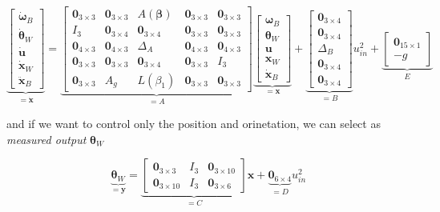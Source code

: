 \begin{equation}
	\underbrace{
		\begin{bmatrix}
			\dot{\boldsymbol{\omega}}_B \\
			\dot{\boldsymbol{\theta}}_W \\
			\dot{\mathbf{u}}            \\
			\dot{\mathbf{x}}_W          \\
			\ddot{\mathbf{x}}_B
		\end{bmatrix}
	}_{=\dot{\mathbf{x}}} =
	\underbrace{
	\begin{bmatrix}
		\mathbf{0}_{3\times 3} & \mathbf{0}_{3\times 3} & A(\boldsymbol{\beta})  & \mathbf{0}_{3\times 3} & \mathbf{0}_{3\times 3} \\
		I_3                    & \mathbf{0}_{3\times 4} & \mathbf{0}_{3\times 4} & \mathbf{0}_{3\times 3} & \mathbf{0}_{3\times 3} \\
		\mathbf{0}_{4\times 3} & \mathbf{0}_{4\times 3} & \Delta_A               & \mathbf{0}_{4\times 3} & \mathbf{0}_{4\times 3} \\
		\mathbf{0}_{3\times 3} & \mathbf{0}_{3\times 3} & \mathbf{0}_{3\times 4} & \mathbf{0}_{3\times 3} & I_3                    \\
		\mathbf{0}_{3\times 3} & A_g                    & L(\beta_1)             & \mathbf{0}_{3\times 3} & \mathbf{0}_{3\times 3}
	\end{bmatrix}
	}_{=A}
	\underbrace{
		\begin{bmatrix}
			\boldsymbol{\omega}_B \\
			\boldsymbol{\theta}_W \\
			\mathbf{u}            \\ 
			\mathbf{x}_W          \\
			\dot{\mathbf{x}}_B
		\end{bmatrix}
	}_{=\mathbf{x}} + 
	\underbrace{
	\begin{bmatrix}
		\mathbf{0}_{3\times 4} \\
		\mathbf{0}_{3\times 4} \\
		\Delta_B               \\
		\mathbf{0}_{3\times 4} \\
		\mathbf{0}_{3\times 4}
	\end{bmatrix}
	}_{=B} u_{in}^2
	+\underbrace{
	\begin{bmatrix}
		\mathbf{0}_{15\times 1} \\
		-g
	\end{bmatrix}}_{E}
\end{equation} 

\noindent and if we want to control only the position and orinetation, we can select as \textit{measured output} $\boldsymbol{\theta}_W$

\begin{equation}
	\underbrace{\boldsymbol{\theta}_W}_{=\mathbf{y}} = 
	\underbrace{\begin{bmatrix}
		\mathbf{0}_{3\times 3}  & I_3 & \mathbf{0}_{3\times 10} \\
		\mathbf{0}_{3\times 10} & I_3 & \mathbf{0}_{3\times 6}
	\end{bmatrix}}_{=C} \mathbf{x} + \underbrace{\mathbf{0}_{6\times 4}}_{=D}u_{in}^2
\end{equation}